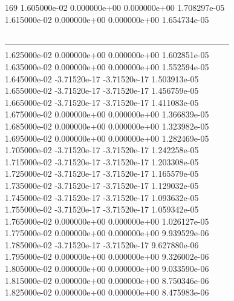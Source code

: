 169	1.605000e-02	0.000000e+00	0.000000e+00	1.708297e-05	\\ 	1.615000e-02	0.000000e+00	0.000000e+00	1.654734e-05	\\ \hline
\\ \hline
--------------------------------------------------------------------------------\\ 	1.625000e-02	0.000000e+00	0.000000e+00	1.602851e-05	\\ 	1.635000e-02	0.000000e+00	0.000000e+00	1.552594e-05	\\ 	1.645000e-02	-3.71520e-17	-3.71520e-17	1.503913e-05	\\ 	1.655000e-02	-3.71520e-17	-3.71520e-17	1.456759e-05	\\ 	1.665000e-02	-3.71520e-17	-3.71520e-17	1.411083e-05	\\ 	1.675000e-02	0.000000e+00	0.000000e+00	1.366839e-05	\\ 	1.685000e-02	0.000000e+00	0.000000e+00	1.323982e-05	\\ 	1.695000e-02	0.000000e+00	0.000000e+00	1.282469e-05	\\ 	1.705000e-02	-3.71520e-17	-3.71520e-17	1.242258e-05	\\ 	1.715000e-02	-3.71520e-17	-3.71520e-17	1.203308e-05	\\ 	1.725000e-02	-3.71520e-17	-3.71520e-17	1.165579e-05	\\ 	1.735000e-02	-3.71520e-17	-3.71520e-17	1.129032e-05	\\ 	1.745000e-02	-3.71520e-17	-3.71520e-17	1.093632e-05	\\ 	1.755000e-02	-3.71520e-17	-3.71520e-17	1.059342e-05	\\ 	1.765000e-02	0.000000e+00	0.000000e+00	1.026127e-05	\\ 	1.775000e-02	0.000000e+00	0.000000e+00	9.939529e-06	\\ 	1.785000e-02	-3.71520e-17	-3.71520e-17	9.627880e-06	\\ 	1.795000e-02	0.000000e+00	0.000000e+00	9.326002e-06	\\ 	1.805000e-02	0.000000e+00	0.000000e+00	9.033590e-06	\\ 	1.815000e-02	0.000000e+00	0.000000e+00	8.750346e-06	\\ 	1.825000e-02	0.000000e+00	0.000000e+00	8.475983e-06	\\ \hline
